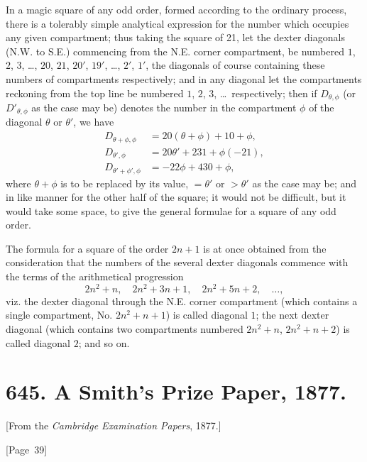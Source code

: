 \documentclass[11pt,a4paper]{book}
\begin{document}
In a magic square of any odd order, formed according to the ordinary
process, there is a tolerably simple analytical expression for the number
which occupies any given compartment; thus taking the square of 21, let
the dexter diagonals (N.W. to S.E.) commencing from the N.E. corner
compartment, be numbered $1$, $2$, $3$, \dots, $20$, $21$, $20'$, $19'$,
\dots, $2'$, $1'$, the diagonals of course containing these numbers of
compartments respectively; and in any diagonal let the compartments
reckoning from the top line be numbered $1$, $2$, $3$, \dots\ respectively;
then if $D_{\theta,\phi}$ (or $D'_{\theta,\phi}$ as the case may be) denotes
the number in the compartment $\phi$ of the diagonal $\theta$ or $\theta'$,
we have
\begin{align*}
D_{\theta+\phi,\phi} &= 20(\theta+\phi) + 10 + \phi, \\
D_{\theta',\phi} &= 20\theta' + 231 + \phi(-21), \\
D_{\theta'+\phi',\phi} &= -22\phi + 430 + \phi,
\end{align*}
where $\theta + \phi$ is to be replaced by its value, $= \theta'$ or $> \theta'$ as the
case may be; and in like manner for the other half of the square; it
would not be difficult, but it would take some space, to give the general
formulae for a square of any odd order.

The formula for a square of the order $2n+1$ is at once obtained from
the consideration that the numbers of the several dexter diagonals
commence with the terms of the arithmetical progression
\[
2n^2 + n, \quad 2n^2 + 3n + 1, \quad 2n^2 + 5n + 2, \quad \dots,
\]
viz. the dexter diagonal through the N.E. corner compartment (which
contains a single compartment, No. $2n^2 + n + 1$) is called diagonal $1$;
the next dexter diagonal (which contains two compartments numbered
$2n^2 + n$, $2n^2 + n + 2$) is called diagonal $2$; and so on.


\newpage
\section*{645. A Smith's Prize Paper, 1877.}

[From the \textit{Cambridge Examination Papers}, 1877.]

\begin{center}
[Page~39]
\end{center}
\end{document}

